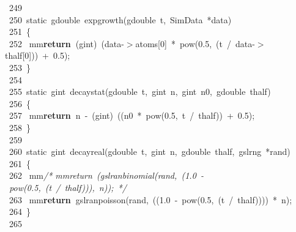 \documentclass[10pt,a4paper]{article}
\newcommand{\hlstd}[1]{\textcolor[rgb]{0,0,0}{#1}}
\newcommand{\hlkey}[1]{\textcolor[rgb]{0,0,0}{\bf{#1}}}
\newcommand{\hlnum}[1]{\textcolor[rgb]{0.16,0.16,1}{#1}}
\newcommand{\hltyp}[1]{\textcolor[rgb]{0.51,0,0}{#1}}
\newcommand{\hlcom}[1]{\textcolor[rgb]{0.51,0.51,0.51}{\it{#1}}}
\newcommand{\hlline}[1]{\textcolor[rgb]{0.33,0.33,0.33}{#1}}
\begin{document}
{}\hlline{\ 249\ }\hlstd{\mbox{}\\
}\hlline{\ 250\ }\hlstd{}\hltyp{static\ }\hlstd{gdouble\ exp\textunderscore growth(gdouble\ t,\ SimData\ *data)\mbox{}\\
}\hlline{\ 251\ }\hlstd{\{\mbox{}\\
}\hlline{\ 252\ }\hlstd{\hlstd{ mm}}\hlkey{return\ }\hlstd{(gint)\ (data-$>$atoms[}\hlnum{0}\hlstd{]\ *\ pow(}\hlnum{0.5}\hlstd{,\ (t\ /\ data-$>$thalf[}\hlnum{0}\hlstd{]))\ +\ }\hlnum{0.5}\hlstd{);\mbox{}\\
}\hlline{\ 253\ }\hlstd{\}\mbox{}\\
}\hlline{\ 254\ }\hlstd{\mbox{}\\
}\hlline{\ 255\ }\hlstd{}\hltyp{static\ }\hlstd{gint\ decay\textunderscore stat(gdouble\ t,\ gint\ n,\ gint\ n0,\ gdouble\ thalf)\mbox{}\\
}\hlline{\ 256\ }\hlstd{\{\mbox{}\\
}\hlline{\ 257\ }\hlstd{\hlstd{ mm}}\hlkey{return\ }\hlstd{n\ -\ (gint)\ ((n0\ *\ pow(}\hlnum{0.5}\hlstd{,\ t\ /\ thalf))\ +\ }\hlnum{0.5}\hlstd{);\mbox{}\\
}\hlline{\ 258\ }\hlstd{\}\mbox{}\\
}\hlline{\ 259\ }\hlstd{\mbox{}\\
}\hlline{\ 260\ }\hlstd{}\hltyp{static\ }\hlstd{gint\ decay\textunderscore real(gdouble\ t,\ gint\ n,\ gdouble\ thalf,\ gsl\textunderscore rng\ *rand)\mbox{}\\
}\hlline{\ 261\ }\hlstd{\{\mbox{}\\
}\hlline{\ 262\ }\hlstd{\hlstd{ mm}}\hlcom{/*\hlstd{ mm}return\ (gsl\textunderscore ran\textunderscore binomial(rand,\ (1.0\ -\ pow(0.5,\ (t\ /\ thalf))),\ n));\ */}\hlstd{\mbox{}\\
}\hlline{\ 263\ }\hlstd{\hlstd{ mm}}\hlkey{return\ }\hlstd{gsl\textunderscore ran\textunderscore poisson(rand,\ ((}\hlnum{1.0\ }\hlstd{-\ pow(}\hlnum{0.5}\hlstd{,\ (t\ /\ thalf))))\ *\ n);\mbox{}\\
}\hlline{\ 264\ }\hlstd{\}\mbox{}\\
}\hlline{\ 265\ }\hlstd{}\mbox{}\\
\normalfont
\end{document}
